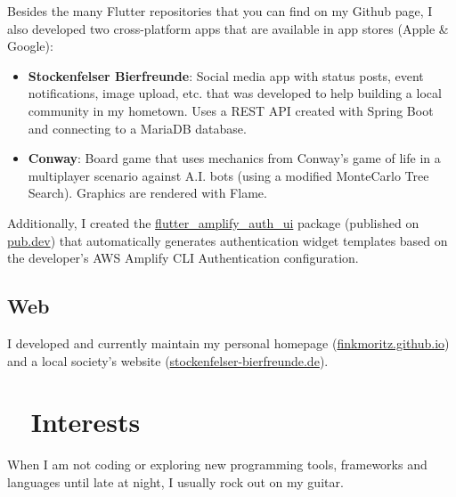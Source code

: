 \documentclass[letterpaper]{twentysecondcv} %
\begin{document}
Besides the many Flutter repositories that you can find on my Github page, I also developed two cross-platform apps that are available in app stores (Apple \& Google):
\begin{itemize}
\item \textbf{Stockenfelser Bierfreunde}: Social media app with status posts, event notifications, image upload, etc. that was developed to help building a local community in my hometown. Uses a REST API created with Spring Boot and connecting to a MariaDB database.
\item \textbf{Conway}: Board game that uses mechanics from Conway's game of life in a multiplayer scenario against A.I. bots (using a modified MonteCarlo Tree Search). Graphics are rendered with Flame.
\end{itemize}
Additionally, I created the \href{https://pub.dev/packages/flutter_amplify_auth_ui}{flutter\_amplify\_auth\_ui} package (published on  \href{https://pub.dev/packages/flutter_amplify_auth_ui}{pub.dev}) that automatically generates authentication widget templates based on the developer's AWS Amplify CLI Authentication configuration.

\subsection{Web}

I developed and currently maintain my personal homepage (\href{https://finkmoritz.github.io}{finkmoritz.github.io}) and a local society's website (\href{https://www.stockenfelser-bierfreunde.de}{stockenfelser-bierfreunde.de}).
\\



\section{~{\normalsize{}} Interests~~}

When I am not coding or exploring new programming tools, frameworks and languages until late at night, I usually rock out on my guitar.


\end{document}

